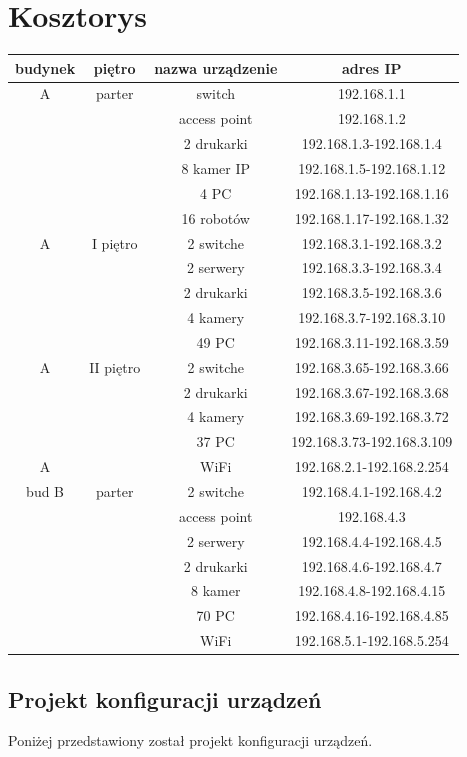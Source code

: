 \documentclass{article}
\begin{document}
\section{Kosztorys}
	\begin{tabular}[!ht]{c|c|c|c}
	budynek &	piętro &	nazwa urządzenie & adres IP\\
	\hline
	A	& parter &	switch & 192.168.1.1\\
	& &access point	& 192.168.1.2\\
	& &2 drukarki	& 192.168.1.3-192.168.1.4\\
	& & 8 kamer IP &	192.168.1.5-192.168.1.12\\
	& & 4 PC	& 192.168.1.13-192.168.1.16\\
	& & 16  robotów &	192.168.1.17-192.168.1.32\\ \hline
	
	A&I piętro	&2 switche	&192.168.3.1-192.168.3.2\\
	&&2 serwery	&192.168.3.3-192.168.3.4\\
	&&2 drukarki&	192.168.3.5-192.168.3.6\\
	&&4 kamery	&192.168.3.7-192.168.3.10\\
	&&49 PC	&192.168.3.11-192.168.3.59\\
	\hline
	
	A &II piętro&	2 switche&	192.168.3.65-192.168.3.66\\
	&&2 drukarki	&192.168.3.67-192.168.3.68\\
	&&4 kamery	&192.168.3.69-192.168.3.72\\
	&&37 PC	&192.168.3.73-192.168.3.109\\
	\hline
	A & &	WiFi	 &192.168.2.1-192.168.2.254\\
	\hline
	\hline
	
	bud B &	parter&2 switche&	192.168.4.1-192.168.4.2\\
	&& access point	&192.168.4.3\\
	&&2 serwery	&192.168.4.4-192.168.4.5\\
	&&2 drukarki&	192.168.4.6-192.168.4.7\\
	&&8 kamer	&192.168.4.8-192.168.4.15\\
	&&70 PC	&192.168.4.16-192.168.4.85\\
	\hline
	&&WiFi &	192.168.5.1-192.168.5.254\\
	\hline
	
\end{tabular}
\subsection{Projekt konfiguracji urządzeń}
Poniżej przedstawiony został projekt konfiguracji urządzeń.
\end{document}
